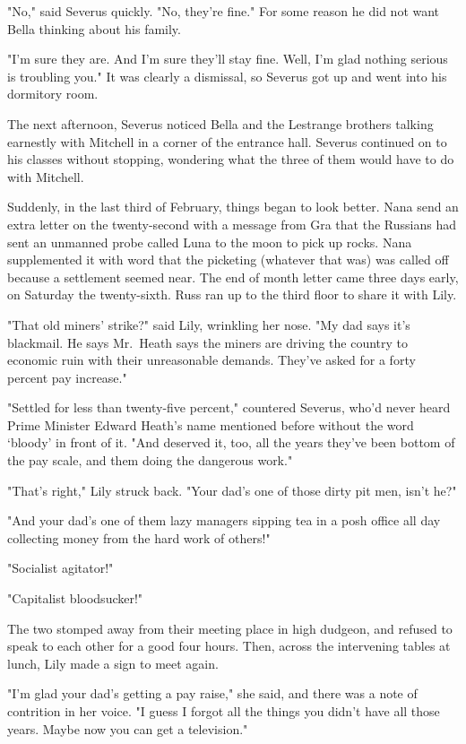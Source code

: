 "No," said Severus quickly. "No, they're{\el} fine." For some reason he did not want Bella thinking about his family.

"I'm sure they are. And I'm sure they'll stay fine. Well, I'm glad nothing serious is troubling you." It was clearly a dismissal, so Severus got up and went into his dormitory room.

The next afternoon, Severus noticed Bella and the Lestrange brothers talking earnestly with Mitchell in a corner of the entrance hall. Severus continued on to his classes without stopping, wondering what the three of them would have to do with Mitchell.

Suddenly, in the last third of February, things began to look better. Nana send an extra letter on the twenty-second with a message from Gra that the Russians had sent an unmanned probe called Luna to the moon to pick up rocks. Nana supplemented it with word that the picketing (whatever that was) was called off because a settlement seemed near. The end of month letter came three days early, on Saturday the twenty-sixth. Russ ran up to the third floor to share it with Lily.

"That old miners' strike?" said Lily, wrinkling her nose. "My dad says it's blackmail. He says Mr.~Heath says the miners are driving the country to economic ruin with their unreasonable demands. They've asked for a forty percent pay increase."

"Settled for less than twenty-five percent," countered Severus, who'd never heard Prime Minister Edward Heath's name mentioned before without the word `bloody' in front of it. "And deserved it, too, all the years they've been bottom of the pay scale, and them doing the dangerous work."

"That's right," Lily struck back. "Your dad's one of those dirty pit men, isn't he?"

"And your dad's one of them lazy managers sipping tea in a posh office all day collecting money from the hard work of others!"

"Socialist agitator!"

"Capitalist bloodsucker!"

The two stomped away from their meeting place in high dudgeon, and refused to speak to each other for a good four hours. Then, across the intervening tables at lunch, Lily made a sign to meet again.

"I'm glad your dad's getting a pay raise," she said, and there was a note of contrition in her voice. "I guess I forgot all the things you didn't have all those years. Maybe now you can get a television."

